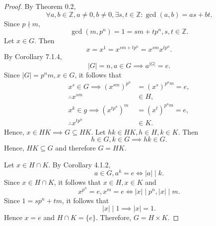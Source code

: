 \documentclass{article}
\theoremstyle{definition}
\begin{document}
\begin{proof}
       By Theorem 0.2,
       \begin{equation*}
           \forall a,b \in \mathbb{Z}, a\neq 0, b\neq 0, \exists s,t \in \mathbb{Z}: \gcd(a,b)=as+bt.
       \end{equation*}
       Since $p\nmid m$,
       \begin{equation*}
           \gcd(m,p^n)=1=sm+tp^n, s,t\in \mathbb{Z}.
       \end{equation*}
       Let $x\in G$. Then
       \begin{equation*}
           x=x^1=x^{sm+tp^n}=x^{sm}x^{tp^n}.
       \end{equation*}
       By Corollary 7.1.4,
       \begin{equation*}
           |G|=n,a\in G \implies a^{|G|}=e.
       \end{equation*}
       Since $|G|=p^nm,x\in G$, it follows that
       \begin{align*}
           x^s \in G \implies (x^{sm})^{p^n} &= (x^s)^{p^nm} = e, \\
           \therefore x^{sm} &\in H, \\
           x^k \in g \implies (x^{tp^n})^m &= (x^t)^{p^nm} = e, \\
           \therefore x^{tp^n} &\in K.
       \end{align*}
       Hence, $x\in HK \implies G \subseteq HK$. Let $hk \in HK, h\in H, k\in K$. Then
       \begin{equation*}
           h\in G, k\in G \implies hk \in G.
       \end{equation*}
       Hence, $HK \subseteq G$ and therefore $G=HK$.
       
       Let $x \in H \cap K$. By Corollary 4.1.2,
       \begin{equation*}
           a\in G, a^k=e \iff |a|\mid k.
       \end{equation*}
       Since $x \in H\cap K$, it follows that $x\in H, x\in K$ and
       \begin{equation*}
            x^{p^n}=e, x^m=e \iff |x| \mid p^n, |x|\mid m.
       \end{equation*}
       Since $1=sp^n+tm$, it follows that
       \begin{equation*}
           |x| \mid 1 \implies |x|=1.
       \end{equation*}
       Hence $x=e$ and $H\cap K=\{e\}$. Therefore, $G=H\times K$.
       

\end{proof}
\end{document}
